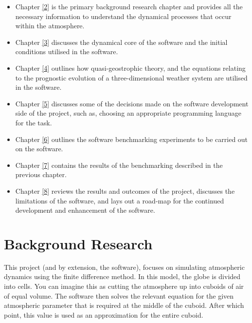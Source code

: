 \begin{itemize}
    \item Chapter \ref{2} is the primary background research chapter and provides all the necessary information to understand the dynamical processes that occur within the atmosphere.
    \item Chapter \ref{3} discusses the dynamical core of the software and the initial conditions utilised in the software.
    \item Chapter \ref{4} outlines how quasi-geostrophic theory, and the equations relating to the prognostic evolution of a three-dimensional weather system are utilised in the software.
    \item Chapter \ref{5} discusses some of the decisions made on the software development side of the project, such as, choosing an appropriate programming language for the task. 
    \item Chapter \ref{6} outlines the software benchmarking experiments to be carried out on the software.
    \item Chapter \ref{7} contains the results of the benchmarking described in the previous chapter.
    \item Chapter \ref{8} reviews the results and outcomes of the project, discusses the limitations of the software, and lays out a road-map for the continued development and enhancement of the software. 
\end{itemize}

\section{Background Research}
This project (and by extension, the software), focuses on simulating atmospheric dynamics using the finite difference method. In this model, the globe is divided into cells. You can imagine this as cutting the atmosphere up into cuboids of air of equal volume. The software then solves the relevant equation for the given atmospheric parameter that is required at the middle of the cuboid. After which point, this value is used as an approximation for the entire cuboid. 

\hfill

